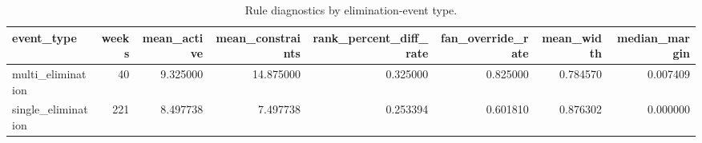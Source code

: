 \begin{table}
\caption{Rule diagnostics by elimination-event type.}
\begin{tabular}{lrrrrrrr}
\toprule
event\_type & weeks & mean\_active & mean\_constraints & rank\_percent\_diff\_rate & fan\_override\_rate & mean\_width & median\_margin \\
\midrule
multi\_elimination & 40 & 9.325000 & 14.875000 & 0.325000 & 0.825000 & 0.784570 & 0.007409 \\
single\_elimination & 221 & 8.497738 & 7.497738 & 0.253394 & 0.601810 & 0.876302 & 0.000000 \\
\bottomrule
\end{tabular}
\end{table}

